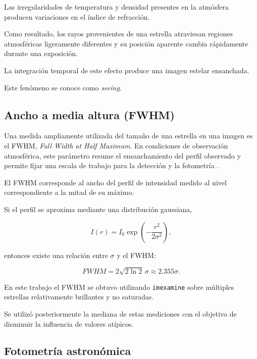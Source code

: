 \documentclass[12pt,letterpaper,oneside]{book}
\begin{document}
Las irregularidades de temperatura y densidad presentes en la atmósfera producen variaciones en el índice de refracción.

Como resultado, los rayos provenientes de una estrella atraviesan regiones atmosféricas ligeramente diferentes y su posición aparente cambia rápidamente durante una exposición.

La integración temporal de este efecto produce una imagen estelar ensanchada.

Este fenómeno se conoce como \textit{seeing}.



\subsection{Ancho a media altura (FWHM)}

Una medida ampliamente utilizada del tamaño de una estrella en una imagen es el FWHM, \textit{Full Width at Half Maximum}. En condiciones de observación atmosférica, este parámetro resume el ensanchamiento del perfil observado y permite fijar una escala de trabajo para la detección y la fotometría \citep{howell2006}.

El FWHM corresponde al ancho del perfil de intensidad medido al nivel correspondiente a la mitad de su máximo.

Si el perfil se aproxima mediante una distribución gaussiana,

\[
I(r)
=
I_0
\exp
\left(
-\frac{r^2}{2\sigma^2}
\right),
\]

entonces existe una relación entre $\sigma$ y el FWHM:

\begin{equation}
FWHM
=
2\sqrt{2\ln 2}\,\sigma
\approx
2.355\sigma.
\end{equation}

En este trabajo el FWHM se obtuvo utilizando \texttt{imexamine} sobre múltiples estrellas relativamente brillantes y no saturadas.

Se utilizó posteriormente la mediana de estas mediciones con el objetivo de disminuir la influencia de valores atípicos.



\subsection{Fotometría astronómica}
\end{document}
